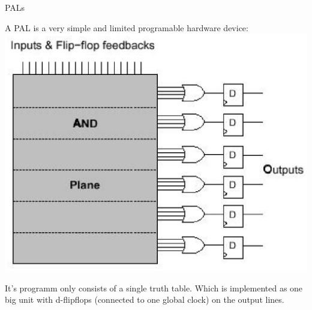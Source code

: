 \documentclass[pdf]{prosper}
\begin{document}


\begin{slide}{PALs}

A PAL is a very simple and limited programable hardware device:\\
\includegraphics[scale=.50]{pal.eps}

It's programm only consists of a single truth table. Which is implemented
as one big unit with d-flipflops (connected to one global clock) on the
output lines.

\end{slide}
\end{document}
